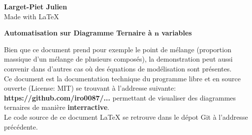 \documentclass[10pt]{article}
\begin{document}
\textbf{Larget-Piet Julien} \\

Made with LaTeX


\vspace*{2cm}

\Huge

\begin{center}

        \textbf{Automatisation sur Diagramme Ternaire à $\mathbf{n}$ variables}\\[0.5cm]

\end{center}

\normalsize

\vspace{1.5cm}

\hspace{1cm} Bien que ce document prend pour exemple le point de mélange (proportion massique d'un mélange de plusieurs composés), la demonstration peut aussi convenir dans d'autres cas où des équations de modélisation sont présentes. \\

\hspace{1cm} Ce document est la documentation technique du programme libre et en source ouverte (License: MIT) se trouvant à l'addresse suivante: \textbf{https://github.com/iro0087/...} permettant de visualiser des diagrammes ternaires de manière \textbf{interractive}. \\

\hspace{1cm} Le code source de ce document LaTeX se retrouve dans le dépot Git à l'addresse précédente. \\

\vspace{3cm}

\hspace{0cm}
\end{document}
